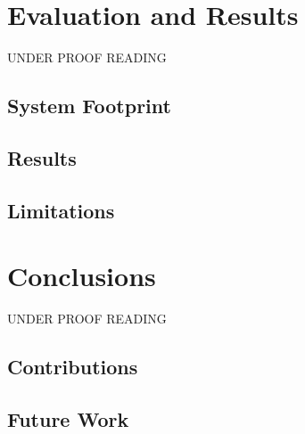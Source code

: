 \documentclass[article,type=msc,colorback,10pt,accentcolor=tud1d]{tudthesis}
\begin{document}
  \cleardoublepage
  
  \hfill
  \section{Evaluation and Results}
  \hfill
	  \par UNDER PROOF READING
		  \subsection{System Footprint}
		  \subsection{Results}
		  \subsection{Limitations}
  \cleardoublepage
  
  \hfill
  \section{Conclusions}
  \hfill
	  \par UNDER PROOF READING
		   \subsection{Contributions}
	   	   \subsection{Future Work}
   	  
   	   
  \cleardoublepage
 
 \clearpage
 
 
 	  
\end{document}
